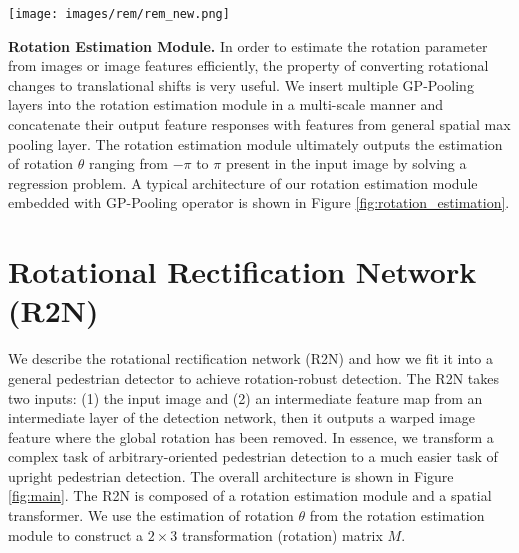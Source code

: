 \documentclass[10pt,twocolumn,letterpaper]{article}
\begin{document}
\begin{figure*}[!t]
    \centering
    \texttt{[image: images/rem/rem\_new.png]}
    \caption{Architecture of a rotation estimation module embedded with the GP-Pooling (blue) operator. This network composes of convolution (red), max pooling (yellow), GP-Pooling (blue), batch normalization (gray), concatenation (green), flatten (magenta), fully connected layer (cyan). The rotation estimation module takes images or image features as the input. The final regression layer produces the estimation of rotation $\theta$ present in the input.}
    \label{fig:rotation_estimation}
    \vspace{-0.3cm}
\end{figure*}


\noindent\textbf{Rotation Estimation Module.} In order to estimate the rotation parameter from images or image features efficiently, the property of converting rotational changes to translational shifts is very useful. We insert multiple GP-Pooling layers into the rotation estimation module in a multi-scale manner and concatenate their output feature responses with features from general spatial max pooling layer. The rotation estimation module ultimately outputs the estimation of rotation $\theta$ ranging from $-\pi$ to $\pi$ present in the input image by solving a regression problem. A typical architecture of our rotation estimation module embedded with GP-Pooling operator is shown in Figure \ref{fig:rotation_estimation}. 

\section{Rotational Rectification Network (R2N)}

We describe the rotational rectification network (R2N) and how we fit it into a general pedestrian detector to achieve rotation-robust detection. The R2N takes two inputs: (1) the input image and (2) an intermediate feature map from an intermediate layer of the detection network, then it outputs a warped image feature where the global rotation has been removed. In essence, we transform a complex task of arbitrary-oriented pedestrian detection to a much easier task of upright pedestrian detection. The overall architecture is shown in Figure \ref{fig:main}. The R2N is composed of a rotation estimation module and a spatial transformer. We use the estimation of rotation $\theta$ from the rotation estimation module to construct a $2 \times 3$ transformation (rotation) matrix $M$.
\end{document}
